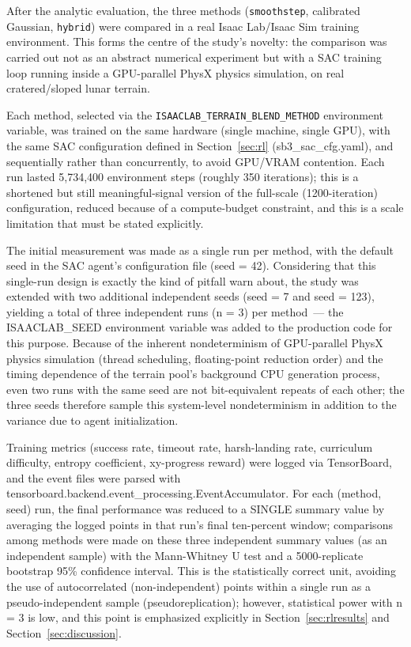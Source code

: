 After the analytic evaluation, the three methods (\texttt{smoothstep}, calibrated Gaussian, \texttt{hybrid}) were compared in a real Isaac Lab/Isaac Sim training environment. This forms the centre of the study's novelty: the comparison was carried out not as an abstract numerical experiment but with a SAC training loop running inside a GPU-parallel PhysX physics simulation, on real cratered/sloped lunar terrain.

Each method, selected via the \texttt{ISAACLAB\_TERRAIN\_BLEND\_METHOD} environment variable, was trained on the same hardware (single machine, single GPU), with the same SAC configuration defined in Section~\ref{sec:rl} (sb3\_sac\_cfg.yaml), and sequentially rather than concurrently, to avoid GPU/VRAM contention. Each run lasted 5,734,400 environment steps (roughly 350 iterations); this is a shortened but still meaningful-signal version of the full-scale (1200-iteration) configuration, reduced because of a compute-budget constraint, and this is a scale limitation that must be stated explicitly.

The initial measurement was made as a single run per method, with the default seed in the SAC agent's configuration file (seed = 42). Considering that this single-run design is exactly the kind of pitfall \citet{henderson2018} warn about, the study was extended with two additional independent seeds (seed = 7 and seed = 123), yielding a total of three independent runs (n = 3) per method~--- the ISAACLAB\_SEED environment variable was added to the production code for this purpose. Because of the inherent nondeterminism of GPU-parallel PhysX physics simulation (thread scheduling, floating-point reduction order) and the timing dependence of the terrain pool's background CPU generation process, even two runs with the same seed are not bit-equivalent repeats of each other; the three seeds therefore sample this system-level nondeterminism in addition to the variance due to agent initialization.

Training metrics (success rate, timeout rate, harsh-landing rate, curriculum difficulty, entropy coefficient, xy-progress reward) were logged via TensorBoard, and the event files were parsed with tensorboard.backend.event\_processing.EventAccumulator. For each (method, seed) run, the final performance was reduced to a SINGLE summary value by averaging the logged points in that run's final ten-percent window; comparisons among methods were made on these three independent summary values (as an independent sample) with the Mann-Whitney U test and a 5000-replicate bootstrap 95\% confidence interval. This is the statistically correct unit, avoiding the use of autocorrelated (non-independent) points within a single run as a pseudo-independent sample (pseudoreplication); however, statistical power with n = 3 is low, and this point is emphasized explicitly in Section~\ref{sec:rlresults} and Section~\ref{sec:discussion}.
